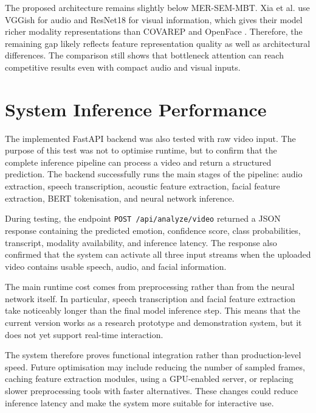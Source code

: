 The proposed architecture remains slightly below MER-SEM-MBT. Xia et al. use VGGish for audio and ResNet18 for visual information, which gives their model richer modality representations than COVAREP and OpenFace \cite{xia2022multimodal}. Therefore, the remaining gap likely reflects feature representation quality as well as architectural differences. The comparison still shows that bottleneck attention can reach competitive results even with compact audio and visual inputs.

\section{System Inference Performance}

\label{sec:inference_perf}

The implemented FastAPI backend was also tested with raw video input. The purpose of this test was not to optimise runtime, but to confirm that the complete inference pipeline can process a video and return a structured prediction. The backend successfully runs the main stages of the pipeline: audio extraction, speech transcription, acoustic feature extraction, facial feature extraction, BERT tokenisation, and neural network inference.

During testing, the endpoint \texttt{POST /api/analyze/video} returned a JSON response containing the predicted emotion, confidence score, class probabilities, transcript, modality availability, and inference latency. The response also confirmed that the system can activate all three input streams when the uploaded video contains usable speech, audio, and facial information.

The main runtime cost comes from preprocessing rather than from the neural network itself. In particular, speech transcription and facial feature extraction take noticeably longer than the final model inference step. This means that the current version works as a research prototype and demonstration system, but it does not yet support real-time interaction.

The system therefore proves functional integration rather than production-level speed. Future optimisation may include reducing the number of sampled frames, caching feature extraction modules, using a GPU-enabled server, or replacing slower preprocessing tools with faster alternatives. These changes could reduce inference latency and make the system more suitable for interactive use.
